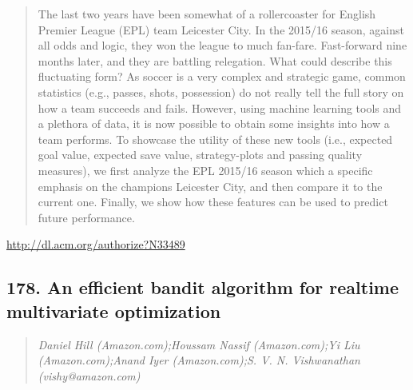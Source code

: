 \documentclass{article}
\begin{document}
\begin{quote}
The last two years have been somewhat of a rollercoaster for English Premier League (EPL) team Leicester City. In the 2015/16 season, against all odds and logic, they won the league to much fan-fare. Fast-forward nine months later, and they are battling relegation. What could describe this fluctuating form? As soccer is a very complex and strategic game, common statistics (e.g., passes, shots, possession) do not really tell the full story on how a team succeeds and fails. However, using machine learning tools and a plethora of data, it is now possible to obtain some insights into how a team performs. To showcase the utility of these new tools (i.e., expected goal value, expected save value, strategy-plots and passing quality measures), we first analyze the EPL 2015/16 season which a specific emphasis on the champions Leicester City, and then compare it to the current one. Finally, we show how these features can be used to predict future performance.
\end{quote}

\href{http://dl.acm.org/authorize?N33489}{http://dl.acm.org/authorize?N33489}

\subsection{178. An efficient bandit algorithm for realtime multivariate optimization}

\begin{quote}
\footnotesize{\textit{Daniel Hill (Amazon.com);Houssam Nassif (Amazon.com);Yi Liu (Amazon.com);Anand Iyer (Amazon.com);S. V. N. Vishwanathan (vishy@amazon.com)}}

\end{quote}
\end{document}
